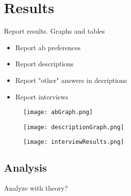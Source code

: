 \section{Results}
\label{sec:results}

Report results. Graphs and tables

\begin{itemize}
\item Report ab preferences
\item Report descriptions
\item Report "other" answers in decriptions
\item Report interviews
\end{itemize}

\begin{figure}[h]
\centering
\texttt{[image: abGraph.png]}
\caption{}
\label{fig:abGraph}
\end{figure}

\begin{figure}[h]
\centering
\texttt{[image: descriptionGraph.png]}
\caption{}
\label{fig:descriptionGraph}
\end{figure}

\begin{figure}[h]
\centering
\texttt{[image: interviewResults.png]}
\caption{}
\label{fig:interviewResults}
\end{figure}

\subsection{Analysis}
\label{subsec:analysis}

Analyze with theory?